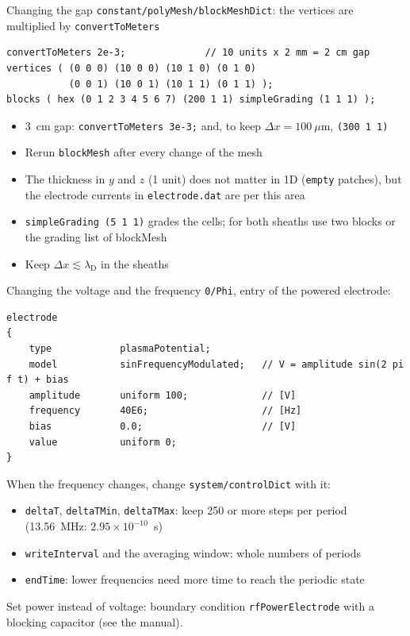 \documentclass[aspectratio=169,11pt]{beamer}
\newcommand{\kw}[1]{\texttt{#1}}
\begin{document}
\begin{frame}[fragile]{Changing the gap}
  \kw{constant/polyMesh/blockMeshDict}: the vertices are multiplied by \kw{convertToMeters}
  \begin{lstlisting}
convertToMeters 2e-3;              // 10 units x 2 mm = 2 cm gap
vertices ( (0 0 0) (10 0 0) (10 1 0) (0 1 0)
           (0 0 1) (10 0 1) (10 1 1) (0 1 1) );
blocks ( hex (0 1 2 3 4 5 6 7) (200 1 1) simpleGrading (1 1 1) );
  \end{lstlisting}
  \begin{itemize}\small
    \item 3~cm gap: \kw{convertToMeters 3e-3;} and, to keep $\Delta x=100~\mu$m,
          \kw{(300 1 1)}
    \item Rerun \kw{blockMesh} after every change of the mesh
    \item The thickness in $y$ and $z$ (1 unit) does not matter in 1D (\kw{empty} patches),
          but the electrode currents in \kw{electrode.dat} are per this area
    \item \kw{simpleGrading (5 1 1)} grades the cells; for both sheaths use two blocks
          or the grading list of blockMesh
    \item Keep $\Delta x\lesssim\lambda_\mathrm{D}$ in the sheaths
  \end{itemize}
\end{frame}

\begin{frame}[fragile]{Changing the voltage and the frequency}
  \kw{0/Phi}, entry of the powered electrode:
  \begin{lstlisting}
electrode
{
    type            plasmaPotential;
    model           sinFrequencyModulated;   // V = amplitude sin(2 pi f t) + bias
    amplitude       uniform 100;             // [V]
    frequency       40E6;                    // [Hz]
    bias            0.0;                     // [V]
    value           uniform 0;
}
  \end{lstlisting}
  When the frequency changes, change \kw{system/controlDict} with it:
  \begin{itemize}\small
    \item \kw{deltaT}, \kw{deltaTMin}, \kw{deltaTMax}: keep 250 or more steps per period
          (13.56~MHz: $2.95\times10^{-10}$~s)
    \item \kw{writeInterval} and the averaging window: whole numbers of periods
    \item \kw{endTime}: lower frequencies need more time to reach the periodic state
  \end{itemize}
  \small Set power instead of voltage: boundary condition \kw{rfPowerElectrode} with a
  blocking capacitor (see the manual).
\end{frame}
\end{document}
